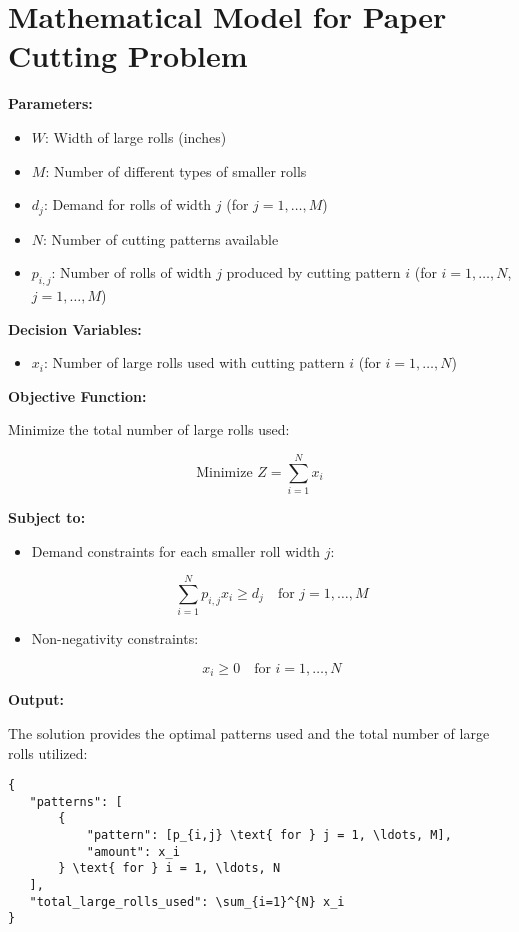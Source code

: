 \documentclass{article}
\begin{document}
\section*{Mathematical Model for Paper Cutting Problem}

\textbf{Parameters:}

\begin{itemize}
    \item $W$: Width of large rolls (inches)
    \item $M$: Number of different types of smaller rolls
    \item $d_j$: Demand for rolls of width $j$ (for $j = 1, \ldots, M$)
    \item $N$: Number of cutting patterns available
    \item $p_{i,j}$: Number of rolls of width $j$ produced by cutting pattern $i$ (for $i = 1, \ldots, N$, $j = 1, \ldots, M$)
\end{itemize}

\textbf{Decision Variables:}

\begin{itemize}
    \item $x_i$: Number of large rolls used with cutting pattern $i$ (for $i = 1, \ldots, N$)
\end{itemize}

\textbf{Objective Function:}

Minimize the total number of large rolls used:

\[
\text{Minimize } Z = \sum_{i=1}^{N} x_i
\]

\textbf{Subject to:}

\begin{itemize}
    \item Demand constraints for each smaller roll width $j$:

    \[
    \sum_{i=1}^{N} p_{i,j} x_i \geq d_j \quad \text{for } j = 1, \ldots, M
    \]

    \item Non-negativity constraints:

    \[
    x_i \geq 0 \quad \text{for } i = 1, \ldots, N
    \]
\end{itemize}

\textbf{Output:}

The solution provides the optimal patterns used and the total number of large rolls utilized:

\begin{verbatim}
{
   "patterns": [
       {
           "pattern": [p_{i,j} \text{ for } j = 1, \ldots, M],
           "amount": x_i
       } \text{ for } i = 1, \ldots, N
   ],
   "total_large_rolls_used": \sum_{i=1}^{N} x_i
}
\end{verbatim}
\end{document}
